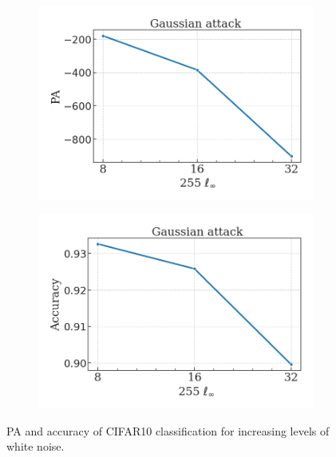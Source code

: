 \begin{figure}[H]
    \centering
    \begin{subfigure}[b]{0.45\textwidth}
        \centering
        \includegraphics[width=\textwidth]{img/results_discussion/adversarial/GAUSSIAN_logPA_eps_single.png}
    \end{subfigure}
    \hfill
    \begin{subfigure}[b]{0.45\textwidth}
        \centering
        \includegraphics[width=\textwidth]{img/results_discussion/adversarial/GAUSSIAN_acc_pa_eps_single.png}
    \end{subfigure}
    \caption{PA and accuracy of CIFAR10 classification for increasing levels of white noise.}
    \label{fig:gaussian_noise}
\end{figure}



